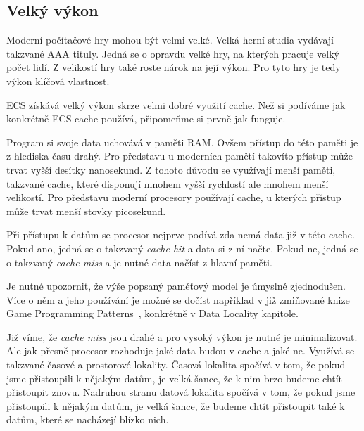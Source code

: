
\subsection{Velký výkon}
\label{sec:ecs_props}

Moderní počítačové hry mohou být velmi velké. Velká herní studia vydávají takzvané AAA tituly. Jedná se o opravdu velké hry, na kterých pracuje velký počet lidí. Z velikostí hry také roste nárok na její výkon. Pro tyto hry je tedy výkon klíčová vlastnost.

ECS získává velký výkon skrze velmi dobré využití cache. Než si podíváme jak konkrétně ECS cache používá, připomeňme si prvně jak funguje.

Program si svoje data uchovává v paměti RAM. Ovšem přístup do této paměti je z hlediska času drahý. Pro představu u moderních pamětí takovíto přístup může trvat vyšší desítky nanosekund. Z tohoto důvodu se využívají menší paměti, takzvané cache, které disponují mnohem vyšší rychlostí ale mnohem menší velikostí. Pro představu moderní procesory používají cache, u kterých přístup může trvat menší stovky picosekund.


Při přístupu k datům se procesor nejprve podívá zda nemá data již v této cache. Pokud ano, jedná se o takzvaný \textit{cache hit} a data si z ní načte. Pokud ne, jedná se o takzvaný \textit{cache miss} a je nutné data načíst z hlavní paměti. 

Je nutné upozornit, že výše popsaný paměťový model je úmyslně zjednodušen. Více o něm a jeho používání je možné se dočíst například v již zmiňované knize Game Programming Patterns~\cite{nystrom2014game}, konkrétně v Data Locality kapitole.

Již víme, že \textit{cache miss} jsou drahé a pro vysoký výkon je nutné je minimalizovat. Ale jak přesně procesor rozhoduje jaké data budou v cache a jaké ne. Využívá se takzvané časové a prostorové lokality. Časová lokalita spočívá v tom, že pokud jsme přistoupili k nějakým datům, je velká šance, že k nim brzo budeme chtít přistoupit znovu. Nadruhou stranu datová lokalita spočívá v tom, že pokud jsme přistoupili k nějakým datům, je velká šance, že budeme chtít přistoupit také k datům, které se nacházejí blízko nich.

